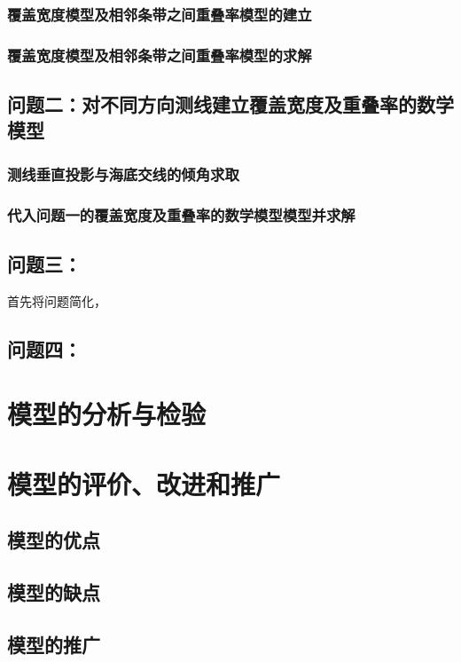 \documentclass[withoutpreface,bwprint]{cumcmthesis} %
\begin{document}
\subsubsection{覆盖宽度模型及相邻条带之间重叠率模型的建立}

\subsubsection{覆盖宽度模型及相邻条带之间重叠率模型的求解}

\subsection{问题二：对不同方向测线建立覆盖宽度及重叠率的数学模型}

\subsubsection{测线垂直投影与海底交线的倾角求取}

\subsubsection{代入问题一的覆盖宽度及重叠率的数学模型模型并求解}

\subsection{问题三：}
首先将问题简化，

\subsection{问题四：}

\section{模型的分析与检验}
\section{模型的评价、改进和推广}
\subsection{模型的优点}
\subsection{模型的缺点}
\subsection{模型的推广}
\end{document}
